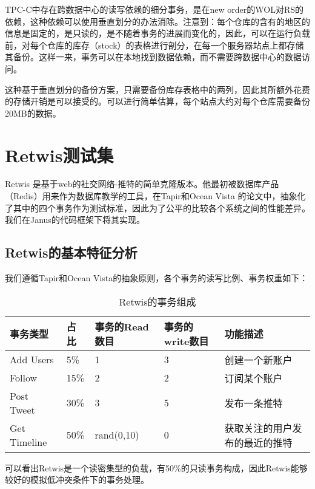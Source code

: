 TPC-C中存在跨数据中心的读写依赖的细分事务，是在new order的WOL对RS的依赖，这种依赖可以使用垂直划分的办法消除。注意到：每个仓库的含有的地区的信息是固定的，是只读的，是不随着事务的进展而变化的，因此，可以在运行负载前，对每个仓库的库存（stock）的表格进行剖分，在每一个服务器站点上都存储其备份。这样一来，事务可以在本地找到数据依赖，而不需要跨数据中心的数据访问。

这种基于垂直划分的备份方案，只需要备份库存表格中的两列，因此其所额外花费的存储开销是可以接受的。可以进行简单估算，每个站点大约对每个仓库需要备份20MB的数据。

\section{Retwis测试集}

Retwis \cite{retwis}是基于web的社交网络-推特的简单克隆版本。他最初被数据库产品（Redis）用来作为数据库教学的工具，在Tapir和Ocean Vista 的论文中，抽象化了其中的四个事务作为测试标准，因此为了公平的比较各个系统之间的性能差异。我们在Janus的代码框架下将其实现。

\subsection{Retwis的基本特征分析}

我们遵循Tapir和Ocean Vista的抽象原则，各个事务的读写比例、事务权重如下：

\begin{table}[htb]
  \centering\small
  \caption{Retwis的事务组成}
  \label{tab:exampletable}
  \begin{tabular}{p{60pt}p{30pt}p{80pt}p{90pt}p{120pt}}
    \toprule
    事务类型   & 占比 & 事务的Read数目 & 事务的write数目 &功能描述\\
    \midrule
    Add Users    & 5\%    & 1 &3 &创建一个新账户\\
    Follow       & 15\%   & 2 &2&订阅某个账户\\
    Post Tweet   & 30\%   & 3 &5 &发布一条推特 \\
    Get Timeline & 50\%   & rand(0,10) &0&获取关注的用户发布的最近的推特  \\

    \bottomrule
  \end{tabular}
\end{table}

可以看出Retwis是一个读密集型的负载，有50\%的只读事务构成，因此Retwis能够较好的模拟低冲突条件下的事务处理。



